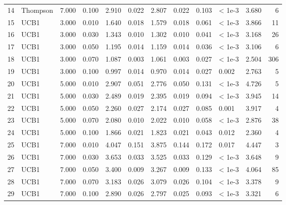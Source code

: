 \begin{tabular}{llrrrrrrrlrr}
14 &  Thompson & 7.000 & 0.100 & 2.910 &     0.022 &  2.807 &     0.022 &      0.103 &  < 1e-3 &           3.680 &    6 \\
15 &      UCB1 & 3.000 & 0.010 & 1.640 &     0.018 &  1.579 &     0.018 &      0.061 &  < 1e-3 &           3.866 &   11 \\
16 &      UCB1 & 3.000 & 0.030 & 1.343 &     0.010 &  1.302 &     0.010 &      0.041 &  < 1e-3 &           3.168 &   26 \\
17 &      UCB1 & 3.000 & 0.050 & 1.195 &     0.014 &  1.159 &     0.014 &      0.036 &  < 1e-3 &           3.106 &    6 \\
18 &      UCB1 & 3.000 & 0.070 & 1.087 &     0.003 &  1.061 &     0.003 &      0.027 &  < 1e-3 &           2.504 &  306 \\
19 &      UCB1 & 3.000 & 0.100 & 0.997 &     0.014 &  0.970 &     0.014 &      0.027 &   0.002 &           2.763 &    5 \\
20 &      UCB1 & 5.000 & 0.010 & 2.907 &     0.051 &  2.776 &     0.050 &      0.131 &  < 1e-3 &           4.726 &    5 \\
21 &      UCB1 & 5.000 & 0.030 & 2.489 &     0.019 &  2.395 &     0.019 &      0.094 &  < 1e-3 &           3.945 &   14 \\
22 &      UCB1 & 5.000 & 0.050 & 2.260 &     0.027 &  2.174 &     0.027 &      0.085 &   0.001 &           3.917 &    4 \\
23 &      UCB1 & 5.000 & 0.070 & 2.080 &     0.010 &  2.022 &     0.010 &      0.058 &  < 1e-3 &           2.876 &   38 \\
24 &      UCB1 & 5.000 & 0.100 & 1.866 &     0.021 &  1.823 &     0.021 &      0.043 &   0.012 &           2.360 &    4 \\
25 &      UCB1 & 7.000 & 0.010 & 4.047 &     0.151 &  3.875 &     0.144 &      0.172 &   0.017 &           4.447 &    3 \\
26 &      UCB1 & 7.000 & 0.030 & 3.653 &     0.033 &  3.525 &     0.033 &      0.129 &  < 1e-3 &           3.648 &    9 \\
27 &      UCB1 & 7.000 & 0.050 & 3.400 &     0.009 &  3.267 &     0.009 &      0.133 &  < 1e-3 &           4.064 &   85 \\
28 &      UCB1 & 7.000 & 0.070 & 3.183 &     0.026 &  3.079 &     0.026 &      0.104 &  < 1e-3 &           3.378 &    9 \\
29 &      UCB1 & 7.000 & 0.100 & 2.890 &     0.026 &  2.797 &     0.025 &      0.093 &  < 1e-3 &           3.321 &    6 \\
\bottomrule
\end{tabular}
